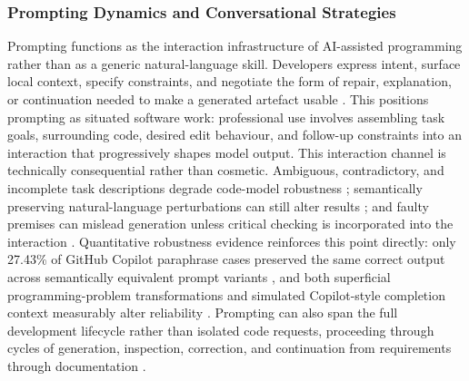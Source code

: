 \subsubsection{Prompting Dynamics and Conversational Strategies}
\label{sec:hai-prompting}
Prompting functions as the interaction infrastructure of AI-assisted programming rather than as a generic natural-language skill. Developers express intent, surface local context, specify constraints, and negotiate the form of repair, explanation, or continuation needed to make a generated artefact usable \cite{nam_understanding_2025,barke_grounded_2023,khojah_beyond_2024}. This positions prompting as situated software work: professional use involves assembling task goals, surrounding code, desired edit behaviour, and follow-up constraints into an interaction that progressively shapes model output. This interaction channel is technically consequential rather than cosmetic. Ambiguous, contradictory, and incomplete task descriptions degrade code-model robustness \cite{larbi_when_2025}; semantically preserving natural-language perturbations can still alter results \cite{chen_nlperturbator_2026}; and faulty premises can mislead generation unless critical checking is incorporated into the interaction \cite{li_refining_2025}. Quantitative robustness evidence reinforces this point directly: only 27.43\% of GitHub Copilot paraphrase cases preserved the same correct output across semantically equivalent prompt variants \cite{mastropaolo_robustness_2023}, and both superficial programming-problem transformations and simulated Copilot-style completion context measurably alter reliability \cite{shirafuji_exploring_2023,jiang_simcopilot_2025}. Prompting can also span the full development lifecycle rather than isolated code requests, proceeding through cycles of generation, inspection, correction, and continuation from requirements through documentation \cite{li_prompting_2024,fayed_prompt-driven_2026,waseem_chatgpt_2024}.

